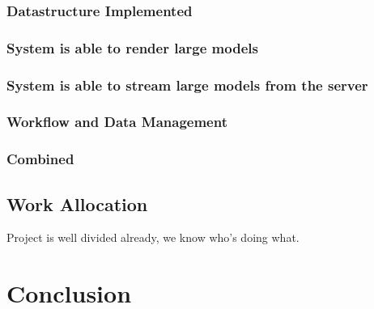 \documentclass[12pt,a4paper]{article}
\begin{document}
\subsubsection*{Datastructure Implemented}
\subsubsection*{System is able to render large models}
\subsubsection*{System is able to stream large models from the server}
\subsubsection{Workflow and Data Management}
\subsubsection{Combined}
\subsection{Work Allocation}
Project is well divided already, we know who's doing what.
\section{Conclusion}





	
\end{document}
